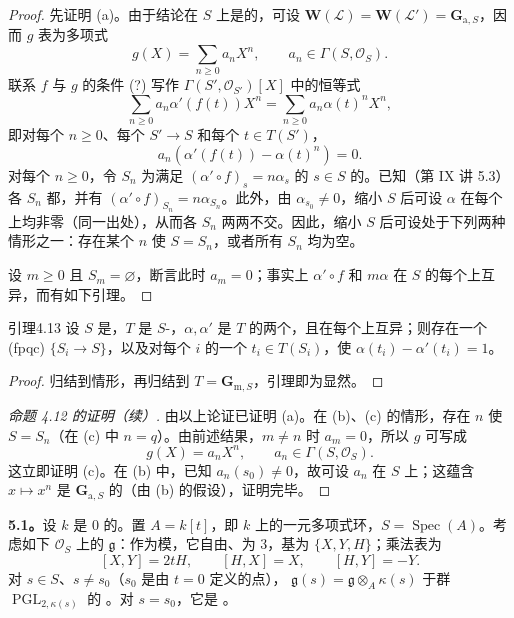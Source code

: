 \begin{proof}
先证明 (a)。由于结论在 $S$ 上是的，可设 $\mathbf W(\mathscr L)=\mathbf W(\mathscr L')=\mathbf G_{\mathrm a,S}$，因而 $g$ 表为多项式
\[
g(X)=\sum_{n\ge0}a_nX^n,\qquad a_n\in\Gamma(S,\mathscr O_S).
\]
联系 $f$ 与 $g$ 的条件 (?) 写作 $\Gamma(S',\mathscr O_{S'})[X]$ 中的恒等式
\[
\sum_{n\ge0}a_n\alpha'(f(t))X^n=\sum_{n\ge0}a_n\alpha(t)^nX^n,
\]
即对每个 $n\ge0$、每个 $S'\to S$ 和每个 $t\in T(S')$，
\[
a_n(\alpha'(f(t))-\alpha(t)^n)=0.
\]
对每个 $n\ge0$，令 $S_n$ 为满足 $(\alpha'\circ f)_s=n\alpha_s$ 的 $s\in S$ 的。已知（第 IX 讲 5.3）各 $S_n$ 都，并有 $(\alpha'\circ f)_{S_n}=n\alpha_{S_n}$。此外，由 $\alpha_{s_0}\ne0$，缩小 $S$ 后可设 $\alpha$ 在每个上均非零（同一出处），从而各 $S_n$ 两两不交。因此，缩小 $S$ 后可设处于下列两种情形之一：存在某个 $n$ 使 $S=S_n$，或者所有 $S_n$ 均为空。

设 $m\ge0$ 且 $S_m=\varnothing$，断言此时 $a_m=0$；事实上 $\alpha'\circ f$ 和 $m\alpha$ 在 $S$ 的每个上互异，而有如下引理。
\end{proof}
\begin{SGAresult}{引理}{4.13}
设 $S$ 是，$T$ 是 $S$-，$\alpha,\alpha'$ 是 $T$ 的两个，且在每个上互异；则存在一个 (fpqc)  $\{S_i\to S\}$，以及对每个 $i$ 的一个 $t_i\in T(S_i)$，使 $\alpha(t_i)-\alpha'(t_i)=1$。
\end{SGAresult}
\begin{proof}
归结到情形，再归结到 $T=\mathbf G_{\mathrm m,S}$，引理即为显然。
\end{proof}
\begin{proof}[命题 4.12 的证明（续）]
由以上论证已证明 (a)。在 (b)、(c) 的情形，存在 $n$ 使 $S=S_n$（在 (c) 中 $n=q$）。由前述结果，$m\ne n$ 时 $a_m=0$，所以 $g$ 可写成
\[
g(X)=a_nX^n,\qquad a_n\in\Gamma(S,\mathscr O_S).
\]
这立即证明 (c)。在 (b) 中，已知 $a_n(s_0)\ne0$，故可设 $a_n$ 在 $S$ 上；这蕴含 $x\mapsto x^n$ 是 $\mathbf G_{\mathrm a,S}$ 的（由 (b) 的假设），证明完毕。
\end{proof}
\textbf{5.1。}设 $k$ 是 $0$ 的。置 $A=k[t]$，即 $k$ 上的一元多项式环，$S=\operatorname{Spec}(A)$。考虑如下 $\mathscr O_S$ 上的  $\mathfrak g$：作为模，它自由、为 $3$，基为 $\{X,Y,H\}$；乘法表为
\[
[X,Y]=2tH,\qquad[H,X]=X,\qquad[H,Y]=-Y.
\]
对 $s\in S$、$s\ne s_0$（$s_0$ 是由 $t=0$ 定义的点）， $\mathfrak g(s)=\mathfrak g\otimes_A\kappa(s)$ 于群 $\operatorname{PGL}_{2,\kappa(s)}$ 的 。对 $s=s_0$，它是 。

